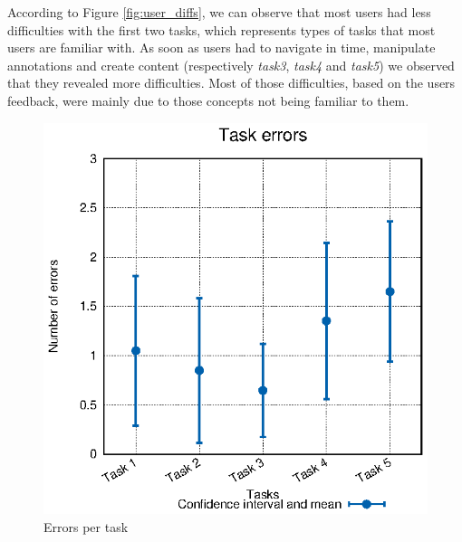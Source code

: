 According to Figure \ref{fig:user_diffs}, we can observe that most users had less difficulties with the first two tasks, which represents types of tasks that most users are familiar with. As soon as users had to navigate in time, manipulate annotations and create content (respectively \emph{task3}, \emph{task4} and \emph{task5}) we observed that they revealed more difficulties. Most of those difficulties, based on the users feedback, were mainly due to those concepts not being familiar to them.

\begin{figure}
\centering
\begin{minipage}{.5\textwidth}
  \centering
    \includegraphics[width=\textwidth]{stats/user_errors.eps}
  \caption{Errors per task}
  \label{fig:user_errors}
\end{minipage}%
\begin{minipage}{.5\textwidth}
  \centering

\end{minipage}
\end{figure}
